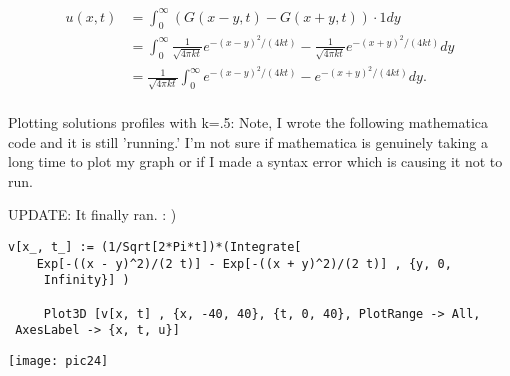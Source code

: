 \documentclass{article}
\begin{document}
\begin{align*}
u(x,t) &= \int_0^{\infty} ( G(x-y,t) - G(x+y,t) ) \cdot 1 dy \\
&=\int_0^{\infty} \frac{1}{\sqrt{4\pi kt}} e^{-(x-y)^2/(4kt)}- \frac{1}{\sqrt{4\pi kt}} e^{-(x+y)^2/(4kt)} dy\\
&=  \frac{1}{\sqrt{4\pi kt}}  \int_0^{\infty}e^{-(x-y)^2/(4kt)}-  e^{-(x+y)^2/(4kt)} dy.\\
\end{align*}


Plotting solutions profiles with k=.5:  Note, I wrote the following mathematica code and it is still 'running.' I'm not sure if mathematica is genuinely taking a long time to plot my graph or if I made a syntax error which is causing it not to run. 

UPDATE: It finally ran. : ) 

\begin{verbatim}
v[x_, t_] := (1/Sqrt[2*Pi*t])*(Integrate[ 
    Exp[-((x - y)^2)/(2 t)] - Exp[-((x + y)^2)/(2 t)] , {y, 0, 
     Infinity}] )
     
     Plot3D [v[x, t] , {x, -40, 40}, {t, 0, 40}, PlotRange -> All, 
 AxesLabel -> {x, t, u}]
\end{verbatim}

\begin{centering}
\texttt{[image: pic24]}
\end{centering}
\end{document}
